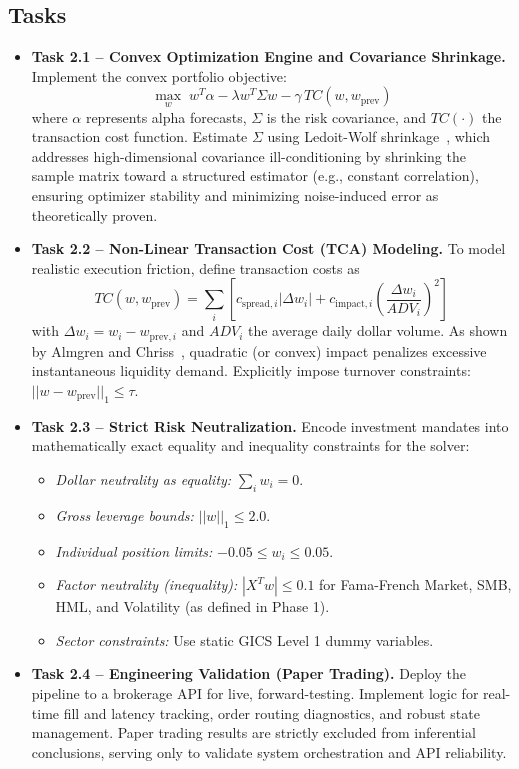 \subsection*{Tasks}
\begin{itemize}
    \item \textbf{Task 2.1 -- Convex Optimization Engine and Covariance Shrinkage.} Implement the convex portfolio objective:
          \[
              \max_{w} \; w^T \alpha - \lambda w^T \Sigma w - \gamma \, TC(w, w_{\text{prev}})
          \]
          where $\alpha$ represents alpha forecasts, $\Sigma$ is the risk covariance, and $TC(\cdot)$ the transaction cost function. Estimate $\Sigma$ using Ledoit-Wolf shrinkage~\cite{LedoitWolf2004}, which addresses high-dimensional covariance ill-conditioning by shrinking the sample matrix toward a structured estimator (e.g., constant correlation), ensuring optimizer stability and minimizing noise-induced error as theoretically proven.

    \item \textbf{Task 2.2 -- Non-Linear Transaction Cost (TCA) Modeling.} To model realistic execution friction, define transaction costs as
          \[
              TC(w, w_{\text{prev}}) = \displaystyle\sum_{i} \left[ c_{\text{spread},i}|\Delta w_i| + c_{\text{impact},i} \left( \frac{\Delta w_i}{ADV_i} \right)^2 \right]
          \]
          with $\Delta w_i = w_i - w_{\text{prev},i}$ and $ADV_i$ the average daily dollar volume. As shown by Almgren and Chriss~\cite{AlmgrenChriss2000}, quadratic (or convex) impact penalizes excessive instantaneous liquidity demand. Explicitly impose turnover constraints: $||w - w_{\text{prev}}||_1 \le \tau$.

    \item \textbf{Task 2.3 -- Strict Risk Neutralization.} Encode investment mandates into mathematically exact equality and inequality constraints for the solver:
          \begin{itemize}
              \item \textit{Dollar neutrality as equality:} $\sum_i w_i = 0$.
              \item \textit{Gross leverage bounds:} $||w||_1 \leq 2.0$.
              \item \textit{Individual position limits:} $-0.05 \leq w_i \leq 0.05$.
              \item \textit{Factor neutrality (inequality):} $|X^T w| \leq 0.1$ for Fama-French Market, SMB, HML, and Volatility (as defined in Phase 1).
              \item \textit{Sector constraints:} Use static \acs{GICS} Level 1 dummy variables.
          \end{itemize}

    \item \textbf{Task 2.4 -- Engineering Validation (Paper Trading).} Deploy the pipeline to a brokerage API for live, forward-testing. Implement logic for real-time fill and latency tracking, order routing diagnostics, and robust state management. Paper trading results are strictly excluded from inferential conclusions, serving only to validate system orchestration and API reliability.
\end{itemize}


